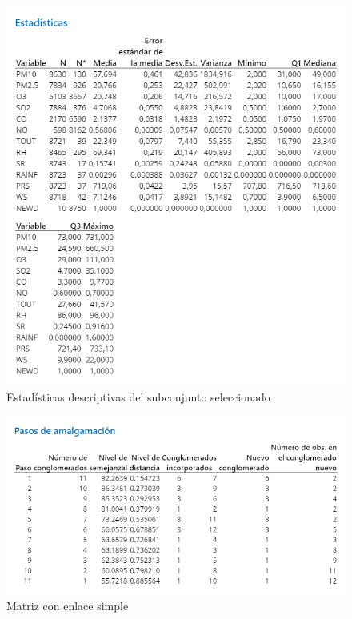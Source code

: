 \documentclass[journal, 10pt]{IEEEtran}                                                          %
\begin{document}
\begin{figure}[H]
    \centering
    \includegraphics[scale=.3]{descriptiva.png}
    \caption{Estadísticas descriptivas del subconjunto seleccionado}
    \label{fig:descriptiva2}
\end{figure}



\begin{figure}[H]
    \centering
    \includegraphics[scale=.3]{matrizSimple.png}
    \caption{Matriz con enlace simple}
    \label{fig:matrizSimple}
\end{figure}
\end{document}
